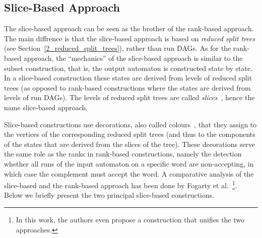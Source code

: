 

\subsection{Slice-Based Approach}
\label{2_slice-based}
The slice-based approach can be seen as the brother of the rank-based approach. The main diffrence is that the slice-based approach is based on \textit{reduced split trees} (see Section~\ref{2_reduced_split_trees}), rather than run DAGs. As for the rank-based approach, the ``mechanics'' of the slice-based approach is similar to the subset construction, that is, the output automaton is constructed state by state. In a slice-based construction these states are derived from levels of reduced split trees (as opposed to rank-based constructions where the states are derived from levels of run DAGs). The levels of reduced split trees are called \textit{slices}~\cite{vardi2007automata}, hence the name slice-based approach.

Slice-based constructions use decorations, also called colours~\cite{2014_joel_ulrich}, that they assign to the vertices of the corresponding reduced split trees (and thus to the components of the states that are derived from the slices of the tree). These decorations serve the same role as the ranks in rank-based constructions, namely the detection whether all runs of the input automaton on a specific word are non-accepting, in  which case the complement must accept the word. A comparative analysis of the slice-based and the rank-based approach has been done by Fogarty et al.~\cite{fogarty2013unifying}\footnote{In this work, the authors even propose a construction that unifies the two approaches.}. Below we briefly present the two principal slice-based constructions. 

